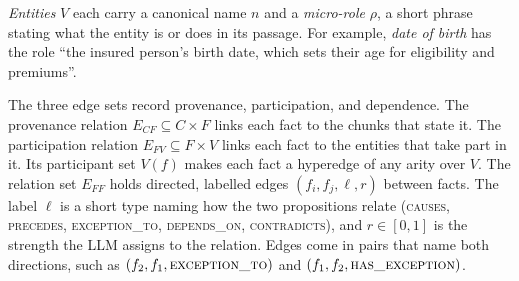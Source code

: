 \documentclass[sigconf, review, anonymous]{acmart}
\newcommand{\rel}[1]{\textsc{#1}}            %
\newcommand{\Ecf}{E_{CF}}
\newcommand{\Efv}{E_{FV}}
\newcommand{\Eff}{E_{FF}}
\begin{document}
\textit{Entities} $V$ each carry a canonical name $n$ and a \emph{micro-role} $\rho$, a short phrase stating what the entity is or does in its passage. For example, \emph{date of birth} has the role ``the insured person's birth date, which sets their age for eligibility and premiums''.

The three edge sets record provenance, participation, and dependence. The provenance relation $\Ecf \subseteq C \times F$ links each fact to the chunks that state it. The participation relation $\Efv \subseteq F \times V$ links each fact to the entities that take part in it. Its participant set $V(f)$ makes each fact a hyperedge of any arity over $V$. The relation set $\Eff$ holds directed, labelled edges $(f_i, f_j, \ell, r)$ between facts. The label $\ell$ is a short type naming how the two propositions relate (\rel{causes}, \rel{precedes}, \rel{exception\_to}, \rel{depends\_on}, \rel{contradicts}), and $r \in [0, 1]$ is the strength the LLM assigns to the relation. Edges come in pairs that name both directions, such as $(f_2, f_1, \rel{exception\_to})$ and $(f_1, f_2, \rel{has\_exception})$.
\end{document}
